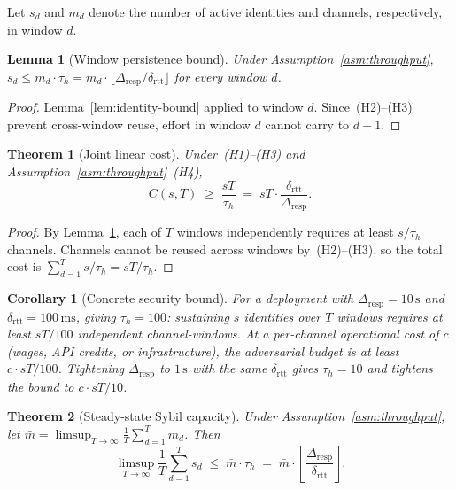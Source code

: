 \documentclass[11pt]{article}
\newtheorem{theorem}{Theorem}
\newtheorem{lemma}{Lemma}
\newtheorem{corollary}{Corollary}
\theoremstyle{remark}
\theoremstyle{plain}
\begin{document}
	Let $s_d$ and $m_d$ denote the number of active identities and channels,
	respectively, in window $d$.
	
	\begin{lemma}[Window persistence bound]
		\label{lem:persistence}
		Under Assumption~\ref{asm:throughput},
		$s_d \le m_d \cdot \tau_h = m_d \cdot
		\lfloor\Delta_{\mathrm{resp}}/\delta_{\mathrm{rtt}}\rfloor$
		for every window $d$.
	\end{lemma}
	
	\begin{proof}
		Lemma~\ref{lem:identity-bound} applied to window $d$. Since~(H2)--(H3)
		prevent cross-window reuse, effort in window $d$ cannot carry to $d+1$.
	\end{proof}
	
	\begin{theorem}[Joint linear cost]
		\label{thm:joint-linear}
		Under~(H1)--(H3) and Assumption~\ref{asm:throughput}~(H4),
		\[
		C(s,T) \;\geq\; \frac{sT}{\tau_h}
		\;=\; sT \cdot \frac{\delta_{\mathrm{rtt}}}{\Delta_{\mathrm{resp}}}.
		\]
	\end{theorem}
	
	\begin{proof}
		By Lemma~\ref{lem:persistence}, each of $T$ windows independently
		requires at least $s/\tau_h$ channels. Channels cannot be reused
		across windows by~(H2)--(H3), so the total cost is
		$\sum_{d=1}^{T} s/\tau_h = sT/\tau_h$.
	\end{proof}
	
	\begin{corollary}[Concrete security bound]
		\label{cor:concrete}
		For a deployment with $\Delta_{\mathrm{resp}} = 10\,\mathrm{s}$ and
		$\delta_{\mathrm{rtt}} = 100\,\mathrm{ms}$, giving $\tau_h = 100$:
		sustaining $s$ identities over $T$ windows requires at least $sT/100$
		independent channel-windows. At a per-channel operational cost of $c$
		(wages, API credits, or infrastructure), the adversarial budget is at
		least $c \cdot sT/100$. Tightening $\Delta_{\mathrm{resp}}$ to
		$1\,\mathrm{s}$ with the same $\delta_{\mathrm{rtt}}$ gives
		$\tau_h = 10$ and tightens the bound to $c \cdot sT/10$.
	\end{corollary}
	
	\begin{theorem}[Steady-state Sybil capacity]
		\label{thm:steady-state}
		Under Assumption~\ref{asm:throughput}, let
		$\bar{m} = \limsup_{T\to\infty}\frac{1}{T}\sum_{d=1}^{T}m_d$.
		Then
		\[
		\limsup_{T\to\infty}\frac{1}{T}\sum_{d=1}^{T}s_d
		\;\le\; \bar{m}\cdot\tau_h
		\;=\; \bar{m}\cdot
		\left\lfloor\frac{\Delta_{\mathrm{resp}}}{\delta_{\mathrm{rtt}}}\right\rfloor.
		\]
	\end{theorem}
	
\end{document}
